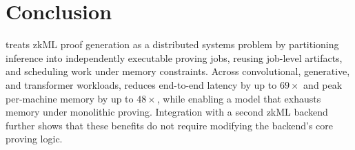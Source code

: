 

\section{Conclusion}
\TITLE{} treats zkML proof generation as a distributed systems problem by partitioning inference into independently executable proving jobs, reusing job-level artifacts, and scheduling work under memory constraints. Across convolutional, generative, and transformer workloads, \TITLE{} reduces end-to-end latency by up to \(69\times\) and peak per-machine memory by up to \(48\times\), while enabling a model that exhausts memory under monolithic proving. Integration with a second zkML backend further shows that these benefits do not require modifying the backend's core proving logic.